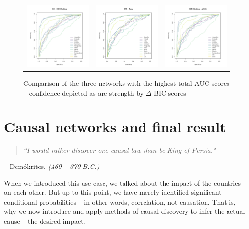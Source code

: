 \documentclass[twoside,twocolumn]{article}
\newcommand{\chapquote}[3]{\begin{quotation} \textit{#1} \end{quotation} \begin{flushright} -- #2, \textit{#3}\end{flushright} }
\begin{document}
\begin{figure}
{\begin{tabular}{ccc}
   \includegraphics[trim={ 0 0 0 1.75cm },clip, width=40mm]{../1. Code/Implied Volatility/Exports/ROC/ROC1} &\includegraphics[trim={ 0 0 0 1.75cm },clip, width=40mm]{../1. Code/Implied Volatility/Exports/ROC/ROC2}  &   \includegraphics[trim={ 0 0 0 1.75cm },clip, width=40mm]{../1. Code/Implied Volatility/Exports/ROC/ROC3}    \\
 \end{tabular}
}
\caption[Comparison of the impact of the networks with  highest AUC scores]{Comparison of the three networks with the highest total AUC scores -- confidence depicted as arc strength by $\Delta$ BIC scores.}
  \label{fig:networkcomparison2}
\end{figure}

\newpage
\clearpage
\section{Causal networks and final result}
\label{subsec:causal}

\vspace*{6mm}

\chapquote{``I would rather discover one causal law  than be King of Persia."}{Dēmókritos}{(460 -- 370 B.C.) \cite[p. 41]{Pearl2009}}

\vspace*{8mm}
When we introduced this use case, we talked about the impact of the countries on each other. But up to this point, we have merely identified significant conditional probabilities -- in other words, correlation, not causation. That is, why we now introduce and apply methods of causal discovery to infer the actual cause -- the desired impact. \cite{Pearl2009}  \cite{Chicharro2014} 
\end{document}
